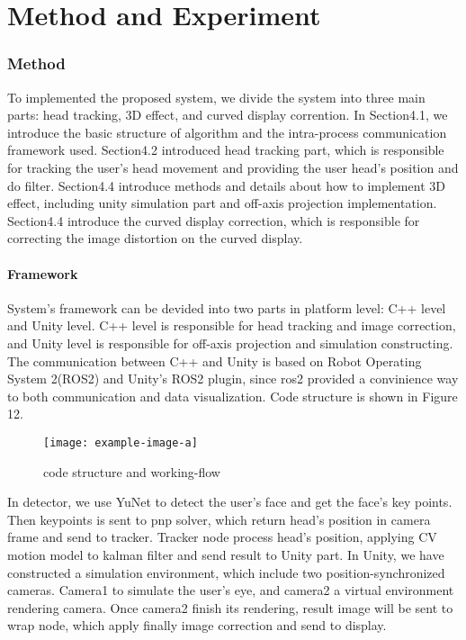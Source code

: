 \part{Method and Experiment}

\section{Method}

To implemented the proposed system, we divide the system into three main parts: head tracking, 3D effect, and curved display corrention. In Section4.1, we introduce the basic structure of algorithm and the intra-process communication framework used. Section4.2 introduced head tracking part, which is responsible for tracking the user's head movement and providing the user head's position and do filter. Section4.4 introduce methods and details about how to implement 3D effect, including unity simulation part and off-axis projection implementation. Section4.4 introduce the curved display correction, which is responsible for correcting the image distortion on the curved display.

\subsection{Framework}
System's framework can be devided into two parts in platform level: C++ level and Unity level. C++ level is responsible for head tracking and image correction, and Unity level is responsible for off-axis projection and simulation constructing. The communication between C++ and Unity is based on Robot Operating System 2(ROS2)\cite{ros2} and Unity's ROS2 plugin\cite{ros2forunity}, since ros2 provided a convinience way to both communication and data visualization. Code structure is shown in Figure 12.

\begin{figure}[htb]
    \centering
    \texttt{[image: example-image-a]}
    \caption{code structure and working-flow}\label{F:test-a}
\end{figure}

In detector, we use YuNet\cite{Wu_2023} to detect the user's face and get the face's key points. Then keypoints is sent to pnp solver, which return head's position in camera frame and send to tracker. Tracker node process head's position, applying CV motion model to kalman filter and send result to Unity part. In Unity, we have constructed a simulation environment, which include two position-synchronized cameras. Camera1 to simulate the user's eye, and camera2 a virtual environment rendering camera. Once camera2 finish its rendering, result image will be sent to wrap node, which apply finally image correction and send to display.

